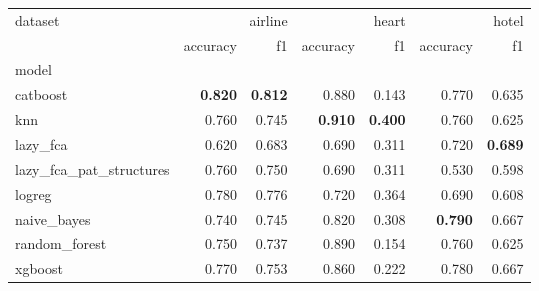 \begin{tabular}{lrrrrrr}
dataset & \multicolumn{2}{r}{airline} & \multicolumn{2}{r}{heart} & \multicolumn{2}{r}{hotel} \\
 & accuracy & f1 & accuracy & f1 & accuracy & f1 \\
model &  &  &  &  &  &  \\
catboost & \textbf{0.820} & \textbf{0.812} & 0.880 & 0.143 & 0.770 & 0.635 \\
knn & 0.760 & 0.745 & \textbf{0.910} & \textbf{0.400} & 0.760 & 0.625 \\
lazy_fca & 0.620 & 0.683 & 0.690 & 0.311 & 0.720 & \textbf{0.689} \\
lazy_fca_pat_structures & 0.760 & 0.750 & 0.690 & 0.311 & 0.530 & 0.598 \\
logreg & 0.780 & 0.776 & 0.720 & 0.364 & 0.690 & 0.608 \\
naive_bayes & 0.740 & 0.745 & 0.820 & 0.308 & \textbf{0.790} & 0.667 \\
random_forest & 0.750 & 0.737 & 0.890 & 0.154 & 0.760 & 0.625 \\
xgboost & 0.770 & 0.753 & 0.860 & 0.222 & 0.780 & 0.667 \\
\end{tabular}
